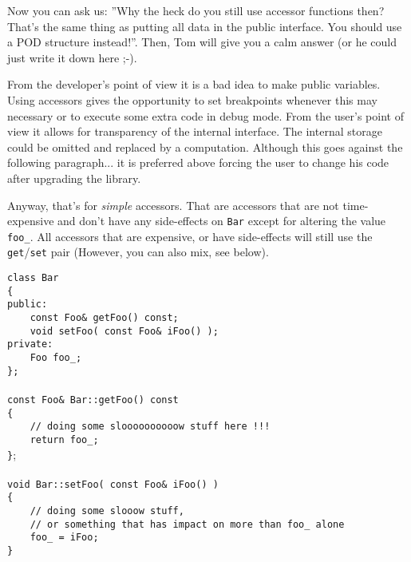 \documentclass[10pt,a4paper,titlepage,dutch]{report}
\begin{document}
Now you can ask us: ''Why the heck do you still use accessor
functions then?  That's the same thing as putting all data in the
public interface.  You should use a POD structure instead!''.
Then, Tom will give you a calm answer (or he could just write it
down here ;-).

From the developer's point of view it is a bad idea to make public
variables.  Using accessors gives the opportunity to set
breakpoints whenever this may necessary or to execute some extra
code in debug mode.  From the user's point of view it allows for
transparency of the internal interface.  The internal storage
could be omitted and replaced by a computation.  Although this
goes against the following paragraph... it is preferred above
forcing the user to change his code after upgrading the library.

Anyway, that's for \emph{simple} accessors.  That are accessors that
are not time-expensive and don't have any side-effects on
\verb|Bar| except for altering the value \verb|foo_|.  All
accessors that are expensive, or have side-effects will still use
the \verb|get|/\verb|set| pair (However, you can also mix, see
below).

\verb|class Bar|\\
\verb|{|\\
\verb|public:|\\
\verb|    const Foo& getFoo() const;|\\
\verb|    void setFoo( const Foo& iFoo() );|\\
\verb|private:|\\
\verb|    Foo foo_;|\\
\verb|};|\\
\verb||\\
\verb|const Foo& Bar::getFoo() const|\\
\verb|{|\\
\verb|    // doing some sloooooooooow stuff here !!!|\\
\verb|    return foo_;|\\
\verb|}|;\\
\verb||\\
\verb|void Bar::setFoo( const Foo& iFoo() )|\\
\verb|{|\\
\verb|    // doing some slooow stuff,|\\
\verb|    // or something that has impact on more than foo_ alone|\\
\verb|    foo_ = iFoo;|\\
\verb|}|\\
\end{document}
